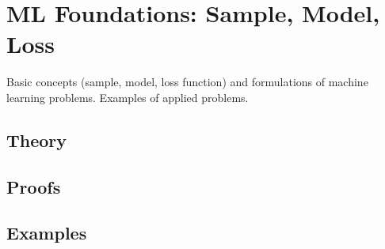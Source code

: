 
\section{ML Foundations: Sample, Model, Loss}
\label{sec:1.4.01-ml-foundations}

\begin{ticket}
Basic concepts (sample, model, loss function) and formulations of machine learning problems. Examples of applied problems.
\end{ticket}

\subsection*{Theory}

\subsection*{Proofs}

\subsection*{Examples}
